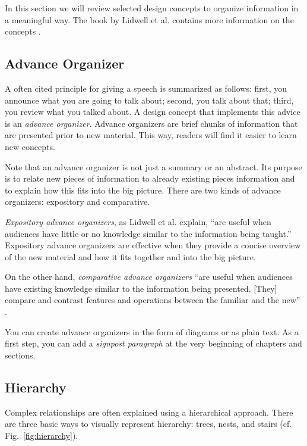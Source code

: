In this section we will review selected design concepts to organize information in a meaningful way. The book by Lidwell et al. contains more information on the concepts \cite{Lidwell10}.

\subsection{Advance Organizer}

A often cited principle for giving a speech is summarized as follows: first, you announce what you are going to talk about; second, you talk about that; third, you review what you talked about. A design concept that implements this advice is an \emph{advance organizer}. Advance organizers are brief chunks of information that are presented prior to new material. This way, readers will find it easier to learn new concepts.

Note that an advance organizer is not just a summary or an abstract. Its purpose is to relate new pieces of information to already existing pieces information and to explain how this fits into the big picture. There are two kinds of advance organizers: expository and comparative.

\emph{Expository advance organizers}, as Lidwell et al. \cite{Lidwell10} explain, ``are useful when audiences have little or no knowledge similar to the information being taught.'' Expository advance organizers are effective when they provide a concise overview of the new material and how it fits together and into the big picture.

On the other hand, \emph{comparative advance organizers} ``are useful when audiences have existing knowledge similar to the information being presented. [They] compare and contrast features and operations between the familiar and the new'' \cite{Lidwell10}.

You can create advance organizers in the form of diagrams or as plain text. As a first step, you can add a \emph{signpost paragraph} at the very beginning of chapters and sections.

\subsection{Hierarchy}

Complex relationships are often explained using a hierarchical approach. 
There are three basic ways to visually represent hierarchy: trees, nests, and stairs (cf. Fig.~\ref{fig:hierarchy}).



